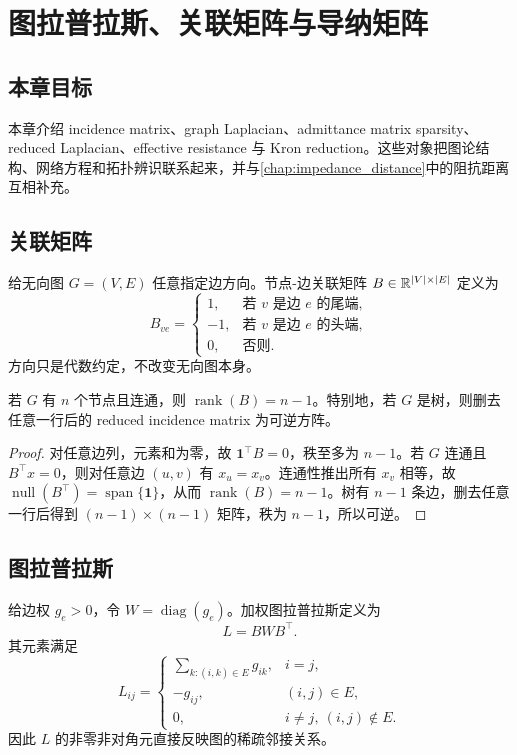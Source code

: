 \chapter{图拉普拉斯、关联矩阵与导纳矩阵}
\label{chap:laplacian}

\section*{本章目标}
本章介绍 incidence matrix、graph Laplacian、admittance matrix sparsity、reduced Laplacian、effective resistance 与 Kron reduction。这些对象把图论结构、网络方程和拓扑辨识联系起来，并与\cref{chap:impedance_distance}中的阻抗距离互相补充。

\section{关联矩阵}

给无向图 $G=(V,E)$ 任意指定边方向。节点-边关联矩阵 $B\in\mathbb{R}^{|V|\times |E|}$ 定义为
\begin{equation}
  B_{ve}=
  \begin{cases}
    1, & \text{若 }v\text{ 是边 }e\text{ 的尾端},\\
    -1,& \text{若 }v\text{ 是边 }e\text{ 的头端},\\
    0, & \text{否则}.
  \end{cases}
\end{equation}
方向只是代数约定，不改变无向图本身。

\begin{proposition}[树的关联矩阵秩]
\label{prop:incidence_rank}
若 $G$ 有 $n$ 个节点且连通，则 $\operatorname{rank}(B)=n-1$。特别地，若 $G$ 是树，则删去任意一行后的 reduced incidence matrix 为可逆方阵。
\end{proposition}

\begin{proof}
对任意边列，元素和为零，故 $\mathbf{1}^\top B=0$，秩至多为 $n-1$。若 $G$ 连通且 $B^\top x=0$，则对任意边 $(u,v)$ 有 $x_u=x_v$。连通性推出所有 $x_v$ 相等，故 $\operatorname{null}(B^\top)=\operatorname{span}\{\mathbf{1}\}$，从而 $\operatorname{rank}(B)=n-1$。树有 $n-1$ 条边，删去任意一行后得到 $(n-1)\times(n-1)$ 矩阵，秩为 $n-1$，所以可逆。
\end{proof}

\section{图拉普拉斯}

给边权 $g_e>0$，令 $W=\operatorname{diag}(g_e)$。加权图拉普拉斯定义为
\begin{equation}
  L=BWB^\top .
  \label{eq:laplacian_bwb}
\end{equation}
其元素满足
\begin{equation}
  L_{ij}=
  \begin{cases}
    \sum_{k:(i,k)\in E}g_{ik}, & i=j,\\
    -g_{ij}, & (i,j)\in E,\\
    0, & i\ne j,\ (i,j)\notin E.
  \end{cases}
\end{equation}
因此 $L$ 的非零非对角元直接反映图的稀疏邻接关系。

